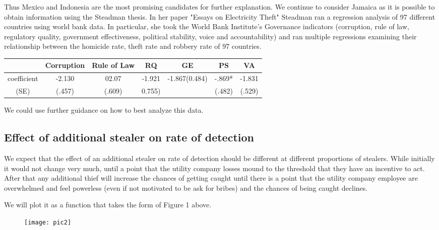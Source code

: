 \documentclass{article}
\begin{document}
Thus Mexico and Indonesia are the most promising candidates for further explanation. We continue to consider Jamaica as it is possible to obtain information using the Steadman thesis. In her paper "Essays on Electricity Theft" Steadman ran a regression analysis of 97 different countries using world bank data. In particular, she took the World Bank Institute's Governance indicators (corruption, rule of law, regulatory quality, government effectiveness, political stability, voice and accountability) and ran multiple regressions examining their relationship between the homicide rate, theft rate and robbery rate of 97 countries. 
\begin{center}

 \centering
\begin{tabular}[h]{c|c|c|c|c|c|c}\centering
  & Corruption & Rule of Law & RQ & GE & PS & VA \\
\hline
coefficient & -2.130 & 02.07 & -1.921 & -1.867(0.484) & -.869* & -1.831 \\
(SE) & (.457) & (.609) &0.755) & & (.482) & (.529)
\end{tabular}

\end{center}

We could use further guidance on how to best analyze this data.

\subsection{Effect of additional stealer on rate of detection}

We expect that the effect of an additional stealer on rate of detection should be different at different proportions of stealers. While initially it would not change very much, until a point that the utility company losses mound to the threshold that they have an incentive to act. After that any additional thief will increase the chances of getting caught until there is a point that the utility company employee are overwhelmed and feel powerless (even if not motivated to be ask for bribes) and the chances of being caught declines. 

We will plot it as a function that takes the form of Figure 1 above.
\begin{figure}
\texttt{[image: pic2]}   %
\end{figure}
\end{document}

